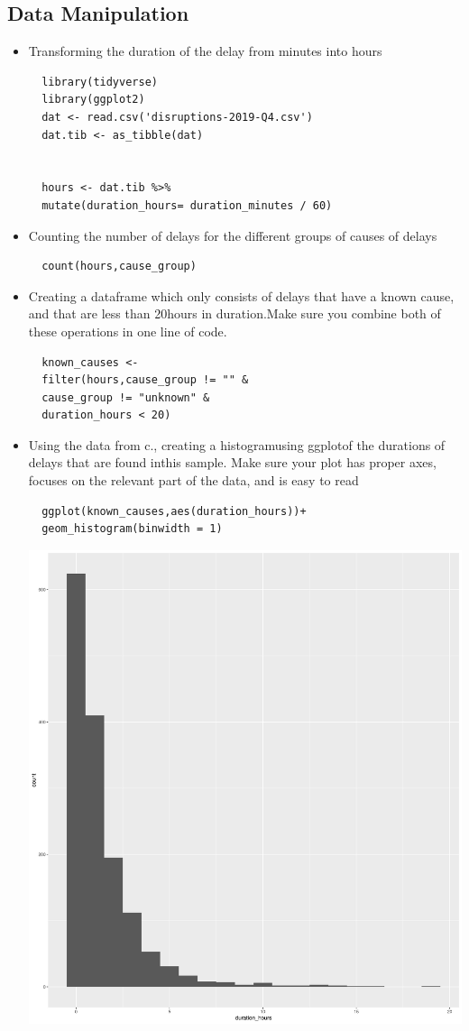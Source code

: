 \documentclass[11pt]{article}
\begin{document}
\subsection{Data Manipulation}
\label{sec:orgafe486a}
\begin{itemize}
\item Transforming the duration of the delay from minutes into hours
\begin{verbatim}
  library(tidyverse)
  library(ggplot2)
  dat <- read.csv('disruptions-2019-Q4.csv')
  dat.tib <- as_tibble(dat)


  hours <- dat.tib %>%
  mutate(duration_hours= duration_minutes / 60)
\end{verbatim}
\item Counting the number of delays for the different groups of causes of delays
\begin{verbatim}
  count(hours,cause_group)
\end{verbatim}
\item Creating a dataframe which only consists of delays that have a known cause, and that are less than 20hours in duration.Make sure you combine both of these operations in one line of code.

\begin{verbatim}
  known_causes <-
  filter(hours,cause_group != "" &
  cause_group != "unknown" &
  duration_hours < 20)
\end{verbatim}
\item Using the data from c., creating a histogramusing ggplotof the durations of delays that are found inthis sample. Make sure your plot has proper axes, focuses on the relevant part of the data, and is easy to read
\begin{verbatim}
  ggplot(known_causes,aes(duration_hours))+
  geom_histogram(binwidth = 1)
\end{verbatim}
\begin{center}
  \includegraphics[width=.9\linewidth]{known_causes.jpg}
\end{center}
\end{itemize}
\end{document}
